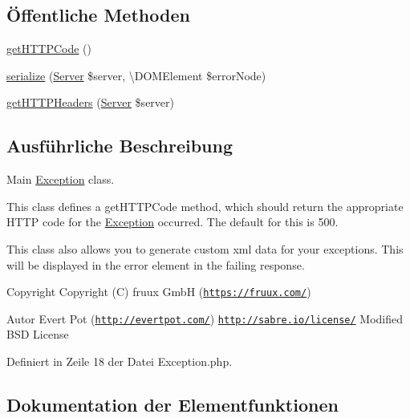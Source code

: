 \subsection*{Öffentliche Methoden}
\begin{DoxyCompactItemize}
\item 
\mbox{\hyperlink{class_sabre_1_1_d_a_v_1_1_exception_a90b6377bebd4da6f8819c795b6068acd}{get\+H\+T\+T\+P\+Code}} ()
\item 
\mbox{\hyperlink{class_sabre_1_1_d_a_v_1_1_exception_a8ec09972f87be00be0cbfa3db4e326a1}{serialize}} (\mbox{\hyperlink{class_sabre_1_1_d_a_v_1_1_server}{Server}} \$server, \textbackslash{}D\+O\+M\+Element \$error\+Node)
\item 
\mbox{\hyperlink{class_sabre_1_1_d_a_v_1_1_exception_aa8737888d98bfdeb5b09e202a5086e4b}{get\+H\+T\+T\+P\+Headers}} (\mbox{\hyperlink{class_sabre_1_1_d_a_v_1_1_server}{Server}} \$server)
\end{DoxyCompactItemize}


\subsection{Ausführliche Beschreibung}
Main \mbox{\hyperlink{class_sabre_1_1_d_a_v_1_1_exception}{Exception}} class.

This class defines a get\+H\+T\+T\+P\+Code method, which should return the appropriate H\+T\+TP code for the \mbox{\hyperlink{class_sabre_1_1_d_a_v_1_1_exception}{Exception}} occurred. The default for this is 500.

This class also allows you to generate custom xml data for your exceptions. This will be displayed in the \textquotesingle{}error\textquotesingle{} element in the failing response.

\begin{DoxyCopyright}{Copyright}
Copyright (C) fruux GmbH (\href{https://fruux.com/}{\tt https\+://fruux.\+com/}) 
\end{DoxyCopyright}
\begin{DoxyAuthor}{Autor}
Evert Pot (\href{http://evertpot.com/}{\tt http\+://evertpot.\+com/})  \href{http://sabre.io/license/}{\tt http\+://sabre.\+io/license/} Modified B\+SD License 
\end{DoxyAuthor}


Definiert in Zeile 18 der Datei Exception.\+php.



\subsection{Dokumentation der Elementfunktionen}
\mbox{\label{class_sabre_1_1_d_a_v_1_1_exception_a90b6377bebd4da6f8819c795b6068acd}} 
